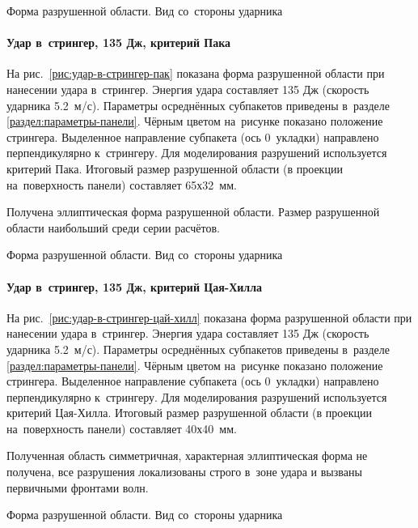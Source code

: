 \documentclass[thesis.tex]{subfiles}
\begin{document}
    {Форма разрушенной области. Вид со~стороны ударника}


\newpage
\paragraph{Удар в~стрингер, 135 Дж, критерий Пака}

На рис.~\ref{рис:удар-в-стрингер-пак} показана форма разрушенной области при нанесении удара в~стрингер. Энергия удара
составляет 135 Дж (скорость ударника 5.2~м/с). Параметры осреднённых субпакетов приведены в~разделе
\ref{раздел:параметры-панели}. Чёрным цветом на~рисунке показано положение стрингера. Выделенное направление субпакета (ось
0\degree\ укладки) направлено перпендикулярно к~стрингеру. Для моделирования разрушений используется критерий Пака.
Итоговый размер разрушенной области (в проекции на~поверхность панели) составляет 65х32~мм.

Получена эллиптическая форма разрушенной области. Размер разрушенной
области наибольший среди серии расчётов.

    {Форма разрушенной области. Вид со~стороны ударника}

\newpage
\paragraph{Удар в~стрингер, 135 Дж, критерий Цая-Хилла}

На рис.~\ref{рис:удар-в-стрингер-цай-хилл} показана форма разрушенной области при нанесении удара в~стрингер. Энергия
удара составляет 135 Дж (скорость ударника 5.2~м/с). Параметры осреднённых субпакетов приведены в~разделе
\ref{раздел:параметры-панели}. Чёрным цветом на~рисунке показано положение стрингера. Выделенное направление субпакета (ось
0\degree\ укладки) направлено перпендикулярно к~стрингеру. Для моделирования разрушений используется критерий Цая-Хилла.
Итоговый размер разрушенной области (в проекции на~поверхность панели) составляет 40х40~мм.

Полученная область симметричная, характерная эллиптическая форма не получена, все разрушения локализованы строго в~зоне
удара и вызваны первичными фронтами волн.

    {Форма разрушенной области. Вид со~стороны ударника}
\end{document}
